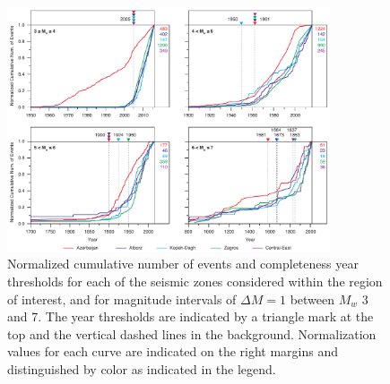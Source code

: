 
\begin{figure}[t]
    \centering
    \includegraphics[width=0.85\textwidth]{figures/pdf/figure-05.pdf}
    \caption{Normalized cumulative number of events and completeness year thresholds for each of the seismic zones considered within the region of interest, and for magnitude intervals of $\Delta M = 1$ between $M_w$ 3 and 7. The year thresholds are indicated by a triangle mark at the top and the vertical dashed lines in the background. Normalization values for each curve are indicated on the right margins and distinguished by color as indicated in the legend.}
    \label{fig:completeness}
\end{figure}

